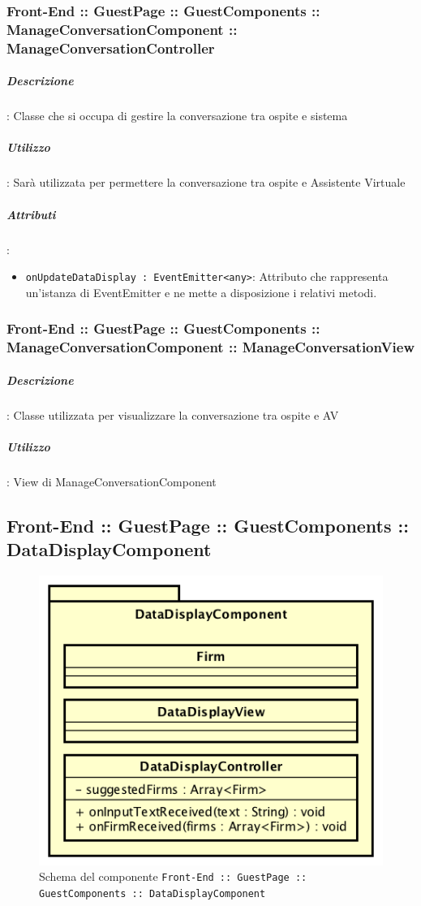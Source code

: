 \documentclass[../ManualeSviluppatore_v1.0.0.tex]{subfiles}
\begin{document}
			\subsubsection{Front-End :: GuestPage :: GuestComponents :: ManageConversationComponent :: ManageConversationController}

				\subparagraph{Descrizione}: Classe che si occupa di gestire la conversazione tra ospite e sistema
				\subparagraph{Utilizzo}: Sarà utilizzata per permettere la conversazione tra ospite e Assistente Virtuale
				\subparagraph{Attributi}:
				\begin{itemize}
					\item \texttt{onUpdateDataDisplay : EventEmitter<any>}: Attributo che rappresenta un'istanza di EventEmitter e ne mette a disposizione i relativi metodi.
				\end{itemize}
			\subsubsection{Front-End :: GuestPage :: GuestComponents :: ManageConversationComponent :: ManageConversationView}

				\subparagraph{Descrizione}: Classe utilizzata per visualizzare la conversazione tra ospite e AV
				\subparagraph{Utilizzo}: View di ManageConversationComponent

	\newpage
	\subsection{Front-End :: GuestPage :: GuestComponents :: DataDisplayComponent}
	\begin{figure}[!h]
		\centering
		\includegraphics[scale=0.7]{Architettura/Front-End/GuestPage/GuestComponents/DataDisplayComponent.png}
		\caption{Schema del componente \texttt{Front-End :: GuestPage :: GuestComponents :: DataDisplayComponent}}
	\end{figure}
\end{document}
